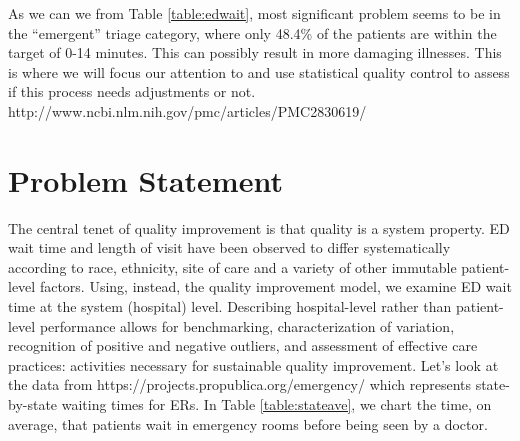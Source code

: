 \documentclass{article}
\begin{document}
As we can we from Table \ref{table:edwait}, most significant problem seems to be in the “emergent” triage category, where only 48.4\% of the patients are within the target of 0-14 minutes. This can possibly result in more damaging illnesses. This is where we will focus our attention to and use statistical quality control to assess if this process needs adjustments or not. http://www.ncbi.nlm.nih.gov/pmc/articles/PMC2830619/
\section*{Problem Statement}
The central tenet of quality improvement is that quality is a system property. ED wait time and length of visit have been observed to differ systematically according to race, ethnicity, site of care and a variety of other immutable patient-level factors. Using, instead, the quality improvement model, we examine ED wait time at the system (hospital) level. Describing hospital-level rather than patient-level performance allows for benchmarking, characterization of variation, recognition of positive and negative outliers, and assessment of effective care practices: activities necessary for sustainable quality improvement.
Let’s look at the data from https://projects.propublica.org/emergency/ which represents state-by-state waiting times for ERs. In Table \ref{table:stateave}, we chart the time, on average, that patients wait in emergency rooms before being seen by a doctor.
\end{document}
